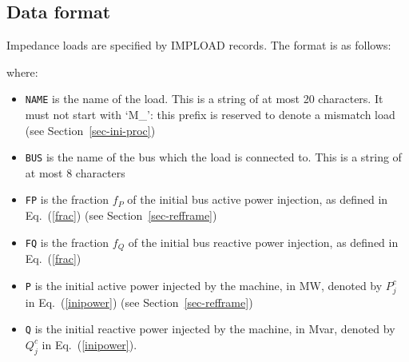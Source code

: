 \subsection{Data format}\label{format-impload}

Impedance loads are specified by IMPLOAD records. The format is as follows:

\hspace*{5ex}{\tt IMPLOAD NAME BUS FP FQ P Q ;}

where:
\begin{itemize}
\item {\tt NAME} is the name of the load. This is a string of at most 20 characters. It must not start with `M\_': this prefix is reserved to denote a mismatch load (see Section~\ref{sec-ini-proc})
\item {\tt BUS} is the name of the bus which the load is connected to. This is a string of at most 8 characters
\item {\tt FP} is the fraction $f_P$ of the initial bus active power injection, as defined in Eq.~(\ref{frac}) (see Section~\ref{sec-refframe})
\item {\tt FQ} is the fraction $f_Q$ of the initial bus reactive power injection, as defined in Eq.~(\ref{frac})
\item {\tt P} is the initial active power injected by the machine, in MW, denoted by $P^c_j$ in Eq.~(\ref{inipower}) (see Section~\ref{sec-refframe})
\item {\tt Q} is the initial reactive power injected by the machine, in Mvar, denoted by $Q^c_j$ in Eq.~(\ref{inipower}).
\end{itemize}
